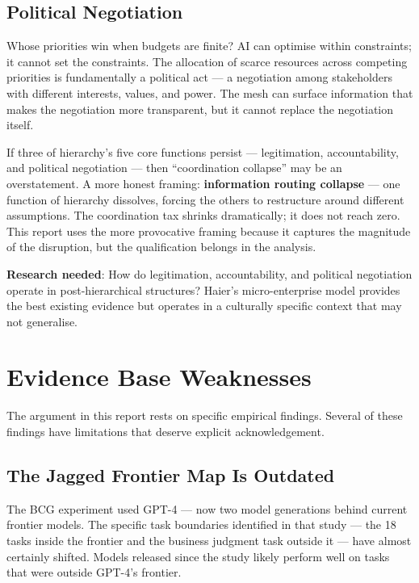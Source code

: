 \subsection{Political Negotiation}

Whose priorities win when budgets are finite? AI can optimise within constraints; it cannot set the constraints. The allocation of scarce resources across competing priorities is fundamentally a political act --- a negotiation among stakeholders with different interests, values, and power. The mesh can surface information that makes the negotiation more transparent, but it cannot replace the negotiation itself.

\begin{cautionbox}[title={An Honest Reframing}]
If three of hierarchy's five core functions persist --- legitimation, accountability, and political negotiation --- then ``coordination collapse'' may be an overstatement. A more honest framing: \textbf{information routing collapse} --- one function of hierarchy dissolves, forcing the others to restructure around different assumptions. The coordination tax shrinks dramatically; it does not reach zero. This report uses the more provocative framing because it captures the magnitude of the disruption, but the qualification belongs in the analysis.
\end{cautionbox}

\textbf{Research needed}: How do legitimation, accountability, and political negotiation operate in post-hierarchical structures? Haier's micro-enterprise model provides the best existing evidence but operates in a culturally specific context that may not generalise.

\section{Evidence Base Weaknesses}

The argument in this report rests on specific empirical findings. Several of these findings have limitations that deserve explicit acknowledgement.

\subsection{The Jagged Frontier Map Is Outdated}

The BCG experiment \parencite{DellAcqua2026} used GPT-4 --- now two model generations behind current frontier models. The specific task boundaries identified in that study --- the 18 tasks inside the frontier and the business judgment task outside it --- have almost certainly shifted. Models released since the study likely perform well on tasks that were outside GPT-4's frontier.

